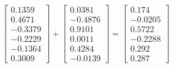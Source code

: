   $$ \begin{bmatrix}0.1359 \\ 0.4671 \\ -0.3379 \\ -0.2229 \\ -0.1364 \\ 0.3009\end{bmatrix} + \begin{bmatrix}0.0381 \\ -0.4876 \\ 0.9101 \\ 0.0011 \\ 0.4284 \\ -0.0139 \end{bmatrix} = \begin{bmatrix} 0.174 \\ -0.0205 \\ 0.5722 \\ -0.2288 \\ 0.292 \\ 0.287 \end{bmatrix} $$


